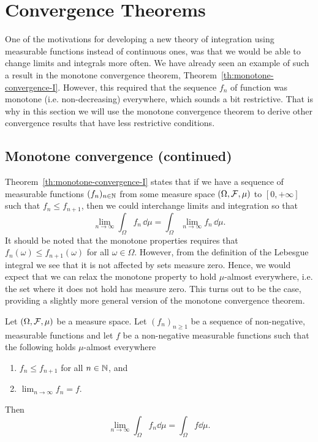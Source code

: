   

\section{Convergence Theorems}

One of the motivations for developing a new theory of integration using measurable functions instead of continuous ones, was that we would be able to change limits and integrals more often. We have already seen an example of such a result in the monotone convergence theorem, Theorem~\ref{th:monotone-convergence-I}. However, this required that the sequence $f_n$ of function was monotone (i.e. non-decreasing) everywhere, which sounds a bit restrictive. That is why in this section we will use the monotone convergence theorem to derive other convergence results that have less restrictive conditions.

\subsection{Monotone convergence (continued)}

Theorem~\ref{th:monotone-convergence-I} states that if we have a sequence of measurable functions $(f_n)_{n \in \mathbb N}$ from some measure space $(\Omega, \mathcal F, \mu)$ to $[0,+\infty]$ such that $f_n \le f_{n+1}$, then we could interchange limits and integration so that
\[
	\lim_{n \to \infty} \int_\Omega f_n \, \dd \mu = \int_\Omega \lim_{n \to \infty} f_n \, \dd \mu.
\]
It should be noted that the monotone properties requires that $f_n(\omega) \le f_{n+1}(\omega)$ for all $\omega \in \Omega$. However, from the definition of the Lebesgue integral we see that it is not affected by sets measure zero. Hence, we would expect that we can relax the monotone property to hold $\mu$-almost everywhere, i.e. the set where it does not hold has measure zero. This turns out to be the case, providing a slightly more general version of the monotone convergence theorem.

\begin{theorem}\label{thm:monotone_convergence_ii}
Let $(\Omega, \mathcal F, \mu)$ be a measure space. Let $(f_n)_{n \ge 1}$ be a sequence of non-negative, measurable functions and let $f$ be a non-negative measurable functions such that the following holds $\mu$-almost everywhere
\begin{enumerate}
\item $f_n \le f_{n+1}$ for all $n \in \mathbb N$, and
\item $\lim_{n \to \infty} f_n = f$.
\end{enumerate}
Then
\[
	\lim_{n \to \infty} \int_\Omega f_n \dd \mu = \int_\Omega f \dd \mu.
\]
\end{theorem}

